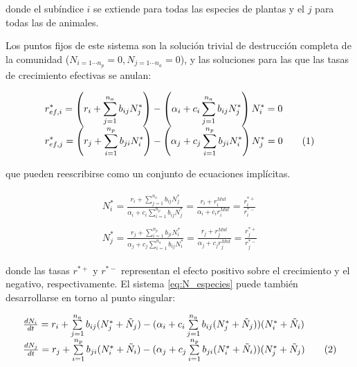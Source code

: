 \noindent donde el subíndice $i$ se extiende para todas las especies de plantas y el $j$ para todas las de animales.

Los puntos fijos de este sistema son la solución trivial de destrucción completa de la comunidad ($N_{i=1\cdots n_{p}}=0, N_{j=1\cdots n_{a}}=0$), y las soluciones para las que las tasas de crecimiento efectivas se anulan: 

\begin{equation}
\begin{array}{lcr}
\displaystyle r^{*}_{ef,i} =\left(r_{i}+ \sum_{j=1}^{n_{a}} b_{ij}N^{*}_{j}\right)- \left(\alpha_{i}+c_{i}\sum_{j=1}^{n_{a}} b_{ij}N^{*}_j\right)N^{*}_{i}
=0 \nonumber\\
\displaystyle r^{*}_{ef,j} = \left(r_{j}+ \sum_{i=1}^{n_{p}} b_{ji}N^{*}_{i}\right)- \left(\alpha_{j}+c_{j}\sum_{i=1}^{n_{p}} b_{ji}N^{*}_i\right)N^{*}_{j} 
=0 
\stepcounter{equation}\tag{\theequation}\label{eq:effrateN}
\end{array}
\end{equation}

\noindent que pueden reescribirse como un conjunto de ecuaciones implícitas.

\begin{eqnarray}
\begin{array}{lcc}
  N^{*}_{i}=\frac{r_{i}+\sum_{j=1}^{n_{a}}b_{ij}N^{*}_{j}}{\alpha_{i}+c_{i}\sum_{i=1}^{n_{p}}b_{ij}N^{*}_{j}} = 
  \frac{r_{i}+r_{i}^{Mut}}{\alpha_{i}+c_{i}r_{i}^{Mut}} = 
  \frac{r_{i}^{*+}}{r_{i}^{*-}}  \nonumber\\
  \\
  N^{*}_{j}=\frac{r_{j}+\sum_{i=1}^{n_{p}}b_{ji}N^{*}_{i}}{\alpha_{j}+c_{j}\sum_{i=1}^{n_{a}}b_{ij}N^{*}_{i}} =
  \frac{r_{j}+r_{j}^{Mut}}{\alpha_{j}+c_{j}r_{j}^{Mut}} =
  \frac{r_{j}^{*+}}{r_{j}^{*-}}
  \end{array}
\end{eqnarray} 
 
\noindent donde las tasas $r^{*+}$ y $r^{*-}$ representan el efecto positivo sobre el crecimiento y el negativo, respectivamente. El sistema \ref{eq:N_especies} puede también desarrollarse en torno al punto singular:

\begin{equation}
\begin{array}{lcl}
\textstyle \frac{dN_{i}}{dt}=r_{i}+\sum\limits_{j=1}^{n_{a}}b_{ij}(N^{*}_{j}+\tilde{N}_{j})- (\alpha_{i}+c_{i}\sum\limits_{j=1}^{n_{a}}b_{ij}(N^{*}_j+\tilde{N}_{j}))(N^{*}_i+\tilde{N}_{i}) \nonumber\\
\textstyle \frac{dN_{j}}{dt}=r_{j}+\sum\limits_{i=1}^{n_{p}}b_{ji}(N^{*}_{i}+\tilde{N}_{i})-(\alpha_{j}+c_{j}\sum\limits_{i=1}^{n_{p}}b_{ji}(N^{*}_i+\tilde{N}_{i}))(N^{*}_j+\tilde{N}_{j}) 
\stepcounter{equation}\tag{\theequation}\label{eq:effrateTaylorN}
\end{array}
\end{equation}

